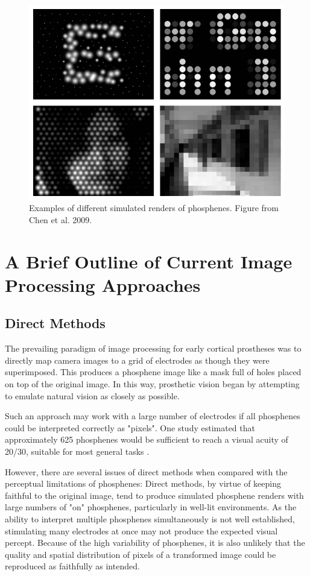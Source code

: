 \documentclass[a4paper,11pt,openany]{book}
\begin{document}
\begin{figure}[htbp]
\centering
\includegraphics[width=.9\linewidth]{./graphics/litreview/simulated.png}
\caption{\label{fig:org5a51f5c}
Examples of different simulated renders of phosphenes. Figure from Chen et al. 2009. \cite{chen_simulating_2009-1}}
\end{figure}


\section*{A Brief Outline of Current Image Processing Approaches}
\label{sec:org7ef356a}
\subsection*{Direct Methods}
\label{sec:org130efc7}

The prevailing paradigm of image processing for early cortical prostheses was to directly map camera images to a grid of electrodes as though they were superimposed. \cite{schmidt_feasibility_1996,dobelle_artificial_2000}
This produces a phosphene image like a mask full of holes placed on top of the original image.
In this way, prosthetic vision began by attempting to emulate natural vision as closely as possible.

Such an approach may work with a large number of electrodes if all phosphenes could be interpreted correctly as "pixels".
One study estimated that approximately 625 phosphenes would be sufficient to reach a visual acuity of 20/30, suitable for most general tasks \cite{cha_simulation_1992}.

However, there are several issues of direct methods when compared with the perceptual limitations of phosphenes:
Direct methods, by virtue of keeping faithful to the original image, tend to produce simulated phosphene renders with large numbers of "on" phosphenes, particularly in well-lit environments.
As the ability to interpret multiple phosphenes simultaneously is not well established, stimulating many electrodes at once may not produce the expected visual percept.
Because of the high variability of phosphenes, it is also unlikely that the quality and spatial distribution of pixels of a transformed image could be reproduced as faithfully as intended.
\end{document}

